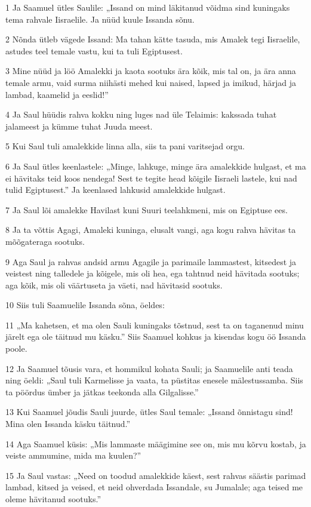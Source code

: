 \par 1 Ja Saamuel ütles Saulile: „Issand on mind läkitanud võidma sind kuningaks tema rahvale Iisraelile. Ja nüüd kuule Issanda sõnu.
\par 2 Nõnda ütleb vägede Issand: Ma tahan kätte tasuda, mis Amalek tegi Iisraelile, astudes teel temale vastu, kui ta tuli Egiptusest.
\par 3 Mine nüüd ja löö Amalekki ja kaota sootuks ära kõik, mis tal on, ja ära anna temale armu, vaid surma niihästi mehed kui naised, lapsed ja imikud, härjad ja lambad, kaamelid ja eeslid!”
\par 4 Ja Saul hüüdis rahva kokku ning luges nad üle Telaimis: kakssada tuhat jalameest ja kümme tuhat Juuda meest.
\par 5 Kui Saul tuli amalekkide linna alla, siis ta pani varitsejad orgu.
\par 6 Ja Saul ütles keenlastele: „Minge, lahkuge, minge ära amalekkide hulgast, et ma ei hävitaks teid koos nendega! Sest te tegite head kõigile Iisraeli lastele, kui nad tulid Egiptusest.” Ja keenlased lahkusid amalekkide hulgast.
\par 7 Ja Saul lõi amalekke Havilast kuni Suuri teelahkmeni, mis on Egiptuse ees.
\par 8 Ja ta võttis Agagi, Amaleki kuninga, elusalt vangi, aga kogu rahva hävitas ta mõõgateraga sootuks.
\par 9 Aga Saul ja rahvas andsid armu Agagile ja parimaile lammastest, kitsedest ja veistest ning talledele ja kõigele, mis oli hea, ega tahtnud neid hävitada sootuks; aga kõik, mis oli väärtuseta ja väeti, nad hävitasid sootuks.
\par 10 Siis tuli Saamuelile Issanda sõna, öeldes:
\par 11 „Ma kahetsen, et ma olen Sauli kuningaks tõstnud, sest ta on taganenud minu järelt ega ole täitnud mu käsku.” Siis Saamuel kohkus ja kisendas kogu öö Issanda poole.
\par 12 Ja Saamuel tõusis vara, et hommikul kohata Sauli; ja Saamuelile anti teada ning öeldi: „Saul tuli Karmelisse ja vaata, ta püstitas enesele mälestussamba. Siis ta pöördus ümber ja jätkas teekonda alla Gilgalisse.”
\par 13 Kui Saamuel jõudis Sauli juurde, ütles Saul temale: „Issand õnnistagu sind! Mina olen Issanda käsku täitnud.”
\par 14 Aga Saamuel küsis: „Mis lammaste määgimine see on, mis mu kõrvu kostab, ja veiste ammumine, mida ma kuulen?”
\par 15 Ja Saul vastas: „Need on toodud amalekkide käest, sest rahvas säästis parimad lambad, kitsed ja veised, et neid ohverdada Issandale, su Jumalale; aga teised me oleme hävitanud sootuks.”
